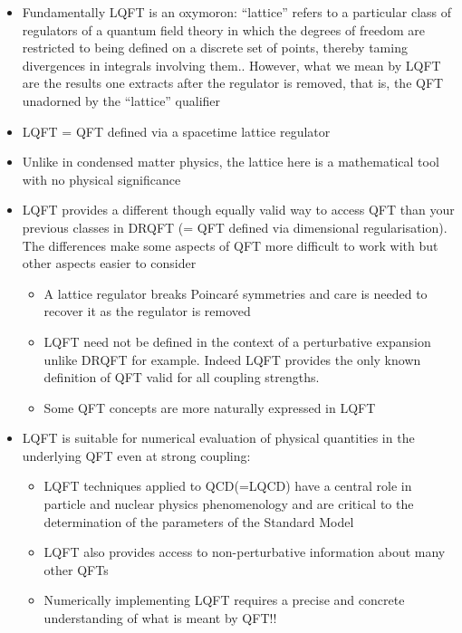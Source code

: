 
\begin{itemize}
  \item Fundamentally LQFT is an oxymoron: ``lattice'' refers to a particular class of regulators of a quantum field theory in which the degrees of freedom are restricted to being defined on a discrete set of points, thereby taming divergences in integrals involving them.. However, what we mean by LQFT are the results one extracts after the regulator is removed, that is, the QFT unadorned by the ``lattice'' qualifier
  \item LQFT = QFT defined via a spacetime lattice regulator
  \item Unlike in condensed matter physics, the lattice here is a mathematical tool with no physical significance
  \item LQFT provides a different though equally valid way to access QFT than your previous classes in DRQFT (= QFT defined via dimensional regularisation). The differences make some aspects of QFT more difficult to work with but other aspects easier to consider
  \begin{itemize}
  \item A lattice regulator breaks Poincar\'e symmetries and care is needed to recover it as the regulator is removed
  \item LQFT need not be defined in the context of a perturbative expansion unlike DRQFT for example. Indeed LQFT provides the only known definition of QFT valid for all coupling strengths.
  \item Some QFT concepts are more naturally expressed in LQFT
  \end{itemize}
  \item LQFT is suitable for numerical evaluation of physical quantities in the underlying QFT even at strong coupling:
  \begin{itemize}
  \item LQFT techniques applied to QCD(=LQCD) have a central role in particle and nuclear physics phenomenology and are critical to the determination of the parameters of the Standard Model
  \item LQFT also provides access to non-perturbative information about many other QFTs
  \item Numerically implementing LQFT requires a precise and concrete understanding of what is meant by QFT!!
\end{itemize}
\end{itemize}

